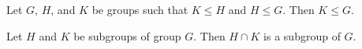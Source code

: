 \begin{theorem}
    \label{theorem : subgroup_trans}
    \leanok
    Let $G$, $H$, and $K$ be groups such that $K \leq H$ and $H \leq G$. Then $K \leq G$.
\end{theorem}

\begin{theorem}
    \label{theorem : subgroup_intersection}
    \leanok
    Let $H$ and $K$ be subgroups of group $G$. Then $H \cap K$ is a subgroup of $G$.
\end{theorem}
